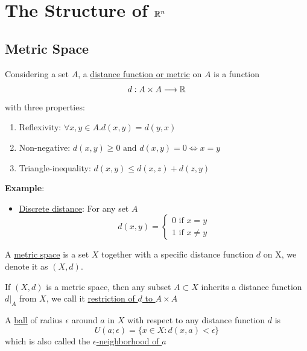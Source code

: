 \chapter{The Structure of $\mathbb{R}^n$}

\section{Metric Space}

\begin{definition}
    Considering a set $A$, a \underline{distance function or metric} on $A$ is a function $$d: A \times A \longrightarrow \mathbb{R}$$
    with three properties:
    \begin{enumerate}
        \item Reflexivity: $\forall x,y \in A. d(x,y)=d(y,x)$
        \item Non-negative: $d(x,y) \geq 0 \text{ and } d(x,y)=0 \Leftrightarrow x=y$
        \item Triangle-inequality: $d(x,y) \leq d(x,z)+d(z,y)$
    \end{enumerate}
\end{definition}

\noindent \textbf{Example}:
\begin{itemize}
    \item \underline{Discrete distance}: For any set $A$
    \begin{equation}
        d(x,y)= \begin{cases}
            0 \text{ if } x=y\\
            1 \text{ if } x \neq y
        \end{cases}
    \end{equation}
\end{itemize}

\begin{definition}
    A \underline{metric space} is a set $X$ together with a specific distance function $d$ on X, we denote it as $(X,d)$.
\end{definition}

\begin{definition}
    If $(X,d)$ is a metric space, then any subset $A \subset X$ inherits a distance function $d|_A$ from $X$, 
    we call it \underline{restriction of $d$ to $A \times A$}
\end{definition}

\begin{definition}
    A \underline{ball} of radius $\epsilon$ around $a$ in $X$ with respect to any distance function $d$ is $$U(a;\epsilon)=\{x \in X: d(x,a) < \epsilon\}$$
    which is also called the \underline{$\epsilon$-neighborhood of $a$}
\end{definition}


